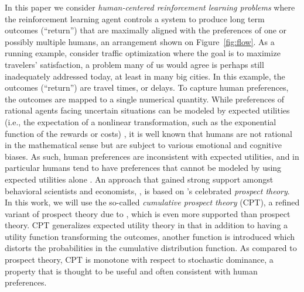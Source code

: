 In this paper we consider \emph{human-centered reinforcement learning problems}
where the  reinforcement learning agent controls a system 
to produce long term outcomes (``return'') that are maximally aligned with the preferences of 
one or possibly multiple humans, an arrangement shown on Figure~\ref{fig:flow}.
As a running example, consider traffic optimization where the goal is to maximize
travelers' satisfaction, a problem many of us would agree is 
perhaps still inadequately addressed today, at least in many big cities.
In this example, the outcomes (``return'') are travel times, or delays. 
To capture human preferences, the outcomes are mapped to a single numerical quantity.
While preferences of rational agents facing uncertain situations can be modeled by expected utilities 
(i.e., the expectation of a nonlinear transformation, such as the exponential function of the rewards or costs) 
\citep{NeuMo44,fishburn1970expectedutility}, 
it is well known that
	humans are not rational in the mathematical sense
	but are subject to various emotional and cognitive biases.
As such, human preferences 
	are inconsistent with expected utilities, and in particular humans tend to have preferences 
	that cannot be modeled by using expected utilities alone
	 \citep{allais53,ellsberg61,kahneman1979prospect}.
An approach that gained 
	strong support amongst behavioral scientists and economists,  \citep[e.g.,][]{starmer2000developments,quiggin2012generalized},
	is based on \cite{kahneman1979prospect}'s celebrated \emph{prospect theory}.
In this work, we will use the so-called \emph{cumulative prospect theory} (CPT),
 	a refined variant of prospect theory due to \cite{tversky1992advances}, 
	which is even more supported than prospect theory.
CPT generalizes expected utility theory in that in addition to having a utility function transforming
	the outcomes, another function is introduced which distorts the probabilities in the cumulative distribution function.
As compared to prospect theory, CPT is monotone with respect to stochastic dominance, a property
	that is thought to be useful and often consistent with human preferences.	
	
